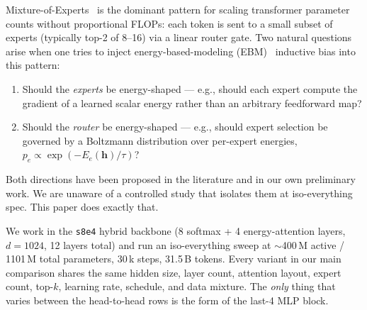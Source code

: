 \documentclass[oneside]{article}
\begin{document}
Mixture-of-Experts~\citep{shazeer2017outrageously,fedus2022switch} is the
dominant pattern for scaling transformer parameter counts without
proportional FLOPs: each token is sent to a small subset of experts
(typically top-2 of 8--16) via a linear router gate. Two natural
questions arise when one tries to inject energy-based-modeling
(EBM)~\citep{lecun2006tutorial,du2019implicit} inductive bias into this
pattern:
\begin{enumerate}[leftmargin=1.5em]
  \item Should the \emph{experts} be energy-shaped --- e.g., should each
        expert compute the gradient of a learned scalar energy rather
        than an arbitrary feedforward map?
  \item Should the \emph{router} be energy-shaped --- e.g., should expert
        selection be governed by a Boltzmann distribution over per-expert
        energies, $p_e \propto \exp(-E_e(\mathbf{h})/\tau)$?
\end{enumerate}
Both directions have been proposed in the literature and in our own
preliminary work. We are unaware of a controlled study that isolates
them at iso-everything spec. This paper does exactly that.

We work in the \texttt{s8e4} hybrid backbone (8 softmax + 4
energy-attention layers, $d{=}1024$, 12 layers total) and run an
iso-everything sweep at $\sim$400\,M active / 1101\,M total parameters,
30\,k steps, 31.5\,B tokens. Every variant in our main comparison shares
the same hidden size, layer count, attention layout, expert count,
top-$k$, learning rate, schedule, and data mixture. The \emph{only}
thing that varies between the head-to-head rows is the form of the
last-4 MLP block.
\end{document}
